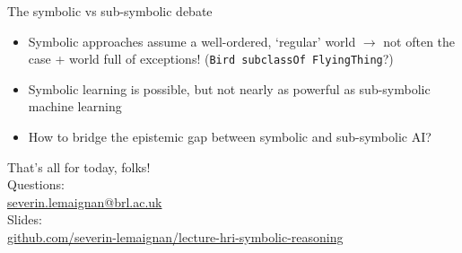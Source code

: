 \documentclass[compress]{beamer}
\makeatletter
\def\beamer@writeslidentry@miniframesoff{%
  \expandafter\beamer@ifempty\expandafter{\beamer@framestartpage}{}%
  {%
    \clearpage\beamer@notesactions%
  }
}
\newcommand*{\miniframesoff}{\let\beamer@writeslidentry=\beamer@writeslidentry@miniframesoff}
\newcommand{\stmt}[1]{{\footnotesize \tt  #1}}
\makeatother
\begin{document}
\miniframesoff

\begin{frame}{The symbolic vs sub-symbolic debate}

    \begin{itemize}
        \item Symbolic approaches assume a well-ordered, `regular' world
            $\rightarrow$ not often the case + world full of exceptions!
            (\stmt{Bird subclassOf FlyingThing}?)
        \item Symbolic learning is possible, but not nearly as powerful as
            sub-symbolic machine learning
        \item How to bridge the epistemic gap between symbolic and sub-symbolic
            AI?
    \end{itemize}
\end{frame}


\begin{frame}{}
    \begin{center}
        \Large
        That's all for today, folks!\\[2em]
        \normalsize
        Questions:\\
        \url{severin.lemaignan@brl.ac.uk} \\[1em]

        Slides:\\
        \href{https://github.com/severin-lemaignan/lecture-hri-symbolic-reasoning}{\small
        github.com/severin-lemaignan/lecture-hri-symbolic-reasoning}

    \end{center}
\end{frame}
\end{document}
